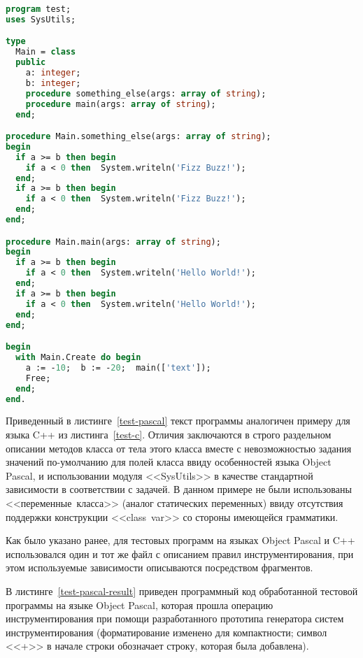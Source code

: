 \begin{lstlisting}[frame=single, language=Pascal, label={test-pascal}, caption={Исходный текст тестового приложения.}]
program test;
uses SysUtils;

type
  Main = class
  public
    a: integer;
    b: integer;
    procedure something_else(args: array of string);
    procedure main(args: array of string);
  end;

procedure Main.something_else(args: array of string);
begin
  if a >= b then begin
    if a < 0 then  System.writeln('Fizz Buzz!');
  end;
  if a >= b then begin
    if a < 0 then  System.writeln('Fizz Buzz!');
  end;
end;

procedure Main.main(args: array of string);
begin
  if a >= b then begin
    if a < 0 then  System.writeln('Hello World!');
  end;
  if a >= b then begin
    if a < 0 then  System.writeln('Hello World!');
  end;
end;

begin
  with Main.Create do begin
    a := -10;  b := -20;  main(['text']);
    Free;
  end;
end.
\end{lstlisting}

Приведенный в листинге~\ref{test-pascal} текст программы аналогичен примеру для языка C++ из листинга~\ref{test-c}.
Отличия заключаются в строго раздельном описании методов класса от тела этого класса вместе с невозможностью задания значений по-умолчанию для полей класса ввиду особенностей языка Object Pascal, и использовании модуля <<SysUtils>> в качестве стандартной зависимости в соответствии с задачей.
В данном примере не были использованы <<переменные~класса>> (аналог статических переменных) ввиду отсутствия поддержки конструкции <<class~var>> со стороны имеющейся грамматики.

Как было указано ранее, для тестовых программ на языках Object Pascal и C++ использовался один и тот же файл с описанием правил инструментирования, при этом используемые зависимости описываются посредством фрагментов.

В листинге~\ref{test-pascal-result} приведен программный код обработанной тестовой программы на языке Object Pascal, которая прошла операцию инструментирования при помощи разработанного прототипа генератора систем инструментирования (форматирование изменено для компактности; символ <<+>> в начале строки обозначает строку, которая была добавлена).

